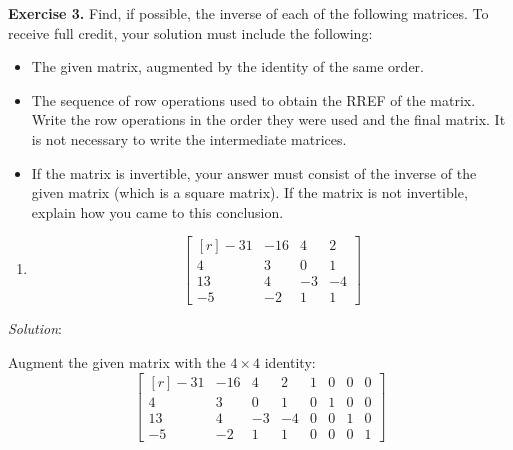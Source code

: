 \documentclass[12pt]{article}
\begin{document}
\textbf{Exercise 3.} Find, if possible, the inverse of each of the following matrices. To receive full credit, your solution must include the following:
\begin{itemize}
\item The given matrix, augmented by the identity of the same order.
\item The sequence of row operations used to obtain the RREF of the matrix. Write the row operations in the order they were used and the final matrix. It is not necessary to write the intermediate matrices.
\item If the matrix is invertible, your answer must consist of the inverse of the given matrix (which is a square matrix). If the matrix is not invertible, explain how you came to this conclusion.
\end{itemize}

\begin{enumerate}
\item 
\[
\left[\begin{matrix*}[r]-31 & -16 & 4 & 2\\4 & 3 & 0 & 1\\13 & 4 & -3 & -4\\-5 & -2 & 1 & 1\end{matrix*}\right]
\]
\end{enumerate}

\emph{Solution}:

Augment the given matrix with the $4\times4$ identity:
\[
\left[\begin{matrix*}[r]-31 & -16 & 4 & 2 & 1 & 0 & 0 & 0\\4 & 3 & 0 & 1 & 0 & 1 & 0 & 0\\13 & 4 & -3 & -4 & 0 & 0 & 1 & 0\\-5 & -2 & 1 & 1 & 0 & 0 & 0 & 1\end{matrix*}\right]
\]
\end{document}
